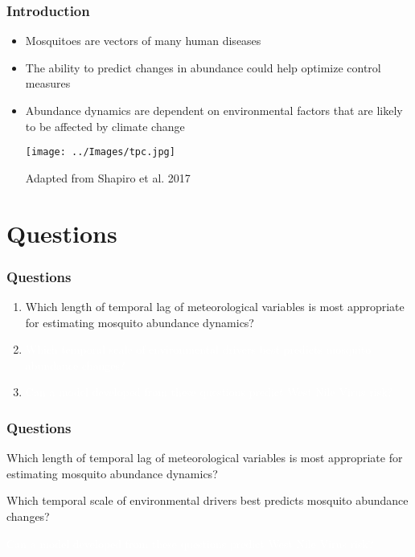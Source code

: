 \documentclass{beamer}
\begin{document}
\begin{frame}{}
\frametitle{Introduction}
\begin{itemize}
	\item Mosquitoes are vectors of many human diseases 
	\item The ability to predict changes in abundance could help optimize control measures
	\item Abundance dynamics are dependent on environmental factors that are likely to be affected by climate change
	
	\texttt{[image: ../Images/tpc.jpg]}
	
	\footnotesize Adapted from Shapiro et al. 2017
	
\end{itemize}

\end{frame}

\section{Questions}
\begin{frame}
\frametitle{Questions}

\begin{enumerate}\Large
	\item Which length of temporal lag of meteorological variables is most appropriate for estimating mosquito abundance dynamics? \vspace{.3cm}
	
	\item \textcolor{white}{Which temporal scale of environmental drivers best predicts mosquito abundance changes?} \vspace{.3cm}
	
	\item \textcolor{white}{Can a model developed from these questions predict West Nile Virus risk?}
	\vspace{1cm}
	
\end{enumerate}

\end{frame}


\begin{frame}
\frametitle{Questions}

\begin{enumerate}\Large
\item Which length of temporal lag of meteorological variables is most appropriate for estimating mosquito abundance dynamics? \vspace{.3cm}

	\item Which temporal scale of environmental drivers best predicts mosquito abundance changes? \vspace{.3cm}
	\textcolor{white}{
	\item Can a model developed from these questions predict West Nile Virus risk?}
\vspace{1cm}

\end{enumerate}

\end{frame}
\end{document}
